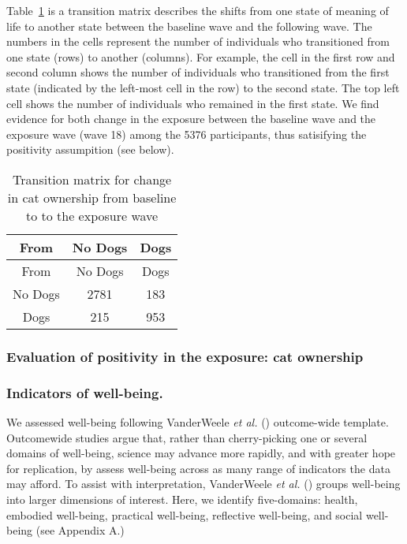 \documentclass[
  singlecolumn,
  9pt]{article}
\begin{document}
Table~\ref{tbl-transition-dogs} is a transition matrix describes the
shifts from one state of meaning of life to another state between the
baseline wave and the following wave. The numbers in the cells represent
the number of individuals who transitioned from one state (rows) to
another (columns). For example, the cell in the first row and second
column shows the number of individuals who transitioned from the first
state (indicated by the left-most cell in the row) to the second state.
The top left cell shows the number of individuals who remained in the
first state. We find evidence for both change in the exposure between
the baseline wave and the exposure wave (wave 18) among the 5376
participants, thus satisifying the positivity assumpition (see below).

\begin{longtable}[]{@{}ccc@{}}
\caption{Transition matrix for change in cat ownership from baseline to
to the exposure wave}\label{tbl-transition-dogs}\tabularnewline
\toprule\noalign{}
From & No Dogs & Dogs \\
\midrule\noalign{}
\endfirsthead
\toprule\noalign{}
From & No Dogs & Dogs \\
\midrule\noalign{}
\endhead
\bottomrule\noalign{}
\endlastfoot
No Dogs & 2781 & 183 \\
Dogs & 215 & 953 \\
\end{longtable}

\subsubsection{Evaluation of positivity in the exposure: cat
ownership}\label{evaluation-of-positivity-in-the-exposure-cat-ownership}

\subsubsection{Indicators of
well-being.}\label{indicators-of-well-being.}

We assessed well-being following VanderWeele \emph{et al.}
() outcome-wide template.
Outcomewide studies argue that, rather than cherry-picking one or
several domains of well-being, science may advance more rapidly, and
with greater hope for replication, by assess well-being across as many
range of indicators the data may afford. To assist with interpretation,
VanderWeele \emph{et al.} () groups
well-being into larger dimensions of interest. Here, we identify
five-domains: health, embodied well-being, practical well-being,
reflective well-being, and social well-being (see Appendix A.)
\end{document}
